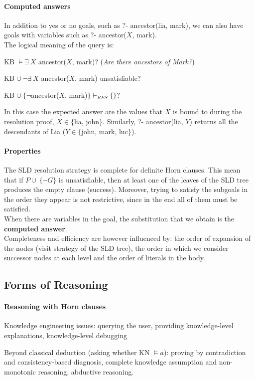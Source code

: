 \documentclass[10pt]{report}
\begin{document}
\paragraph{Computed answers} In addition to yes or no goals, such as ?- ancestor(lia, mark), we can also have goals with variables such as ?- ancestor($X$, mark).\\
The logical meaning of the query is:
\begin{list}{}{}
	\item KB $\vDash\exists\:X$ ancestor($X$, mark)? (\textit{Are there ancestors of Mark?})
	\item KB $\cup\:\neg\exists\:X$ ancestor($X$, mark) unsatisfiable?
	\item KB $\cup\:\{\neg$ancestor($X$, mark)$\}\vdash_{RES} \{\}$?
\end{list}
In this case the expected answer are the values that $X$ is bound to during the resolution proof, $X\in\{$lia, john$\}$. Similarly, ?- ancestor(lia, $Y$) returns all the descendants of Lia ($Y\in\{$john, mark, luc$\}$).
\paragraph{Properties} The SLD resolution strategy is complete for definite Horn clauses. This mean that if $P\cup\:\{\neg G\}$ is unsatisfiable, then at least one of the leaves of the SLD tree produces the empty clause (success). Moreover, trying to satisfy the subgoals in the order they appear is not restrictive, since in the end all of them must be satisfied.\\
When there are variables in the goal, the substitution that we obtain is the \textbf{computed answer}.\\
Completeness and efficiency are however influenced by: the order of expansion of the nodes (visit strategy of the SLD tree), the order in which we consider successor nodes at each level and the order of literals in the body.
\subsection{Forms of Reasoning}
\paragraph{Reasoning with Horn clauses}\begin{list}{}{}
	\item Knowledge engineering issues: querying the user, providing knowledge-level explanations, knowledge-level debugging
	\item Beyond classical deduction (asking whether KN $\vDash a$): proving by contradiction and consistency-based diagnosis, complete knowledge assumption and non-monotonic reasoning, abductive reasoning.
\end{list}
\end{document}
